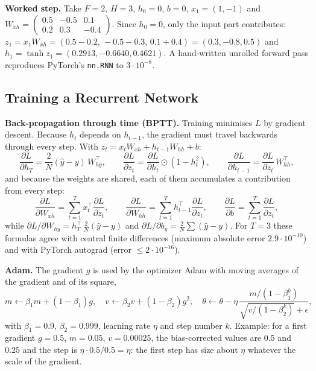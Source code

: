\documentclass[11pt, a4paper]{article}
\begin{document}
\textbf{Worked step.} Take $F=2$, $H=3$, $h_0=0$, $b=0$, $x_1=(1,-1)$ and $W_{xh}=\begin{pmatrix}0.5&-0.5&0.1\\0.2&0.3&-0.4\end{pmatrix}$. Since $h_0=0$, only the input part contributes:
$z_1=x_1W_{xh}=(0.5-0.2,\,-0.5-0.3,\,0.1+0.4)=(0.3,-0.8,0.5)$ and $h_1=\tanh z_1=(0.2913,-0.6640,0.4621)$.
A hand-written unrolled forward pass reproduces PyTorch's \texttt{nn.RNN} to $3\cdot10^{-8}$.

\subsection{Training a Recurrent Network}
\label{sec:train}

\textbf{Back-propagation through time (BPTT).} Training minimises $L$ by gradient descent. Because $h_t$ depends on $h_{t-1}$, the gradient must travel backwards through every step.
With $z_t=x_tW_{xh}+h_{t-1}W_{hh}+b$:
\begin{equation}
\frac{\partial L}{\partial h_T}=\frac{2}{N}(\hat y-y)\,W_{hy}^\top,\qquad
\frac{\partial L}{\partial z_t}=\frac{\partial L}{\partial h_t}\odot(1-h_t^2),\qquad
\frac{\partial L}{\partial h_{t-1}}=\frac{\partial L}{\partial z_t}\,W_{hh}^\top ,
\label{eq:bptt}
\end{equation}
and because the weights are shared, each of them accumulates a contribution from every step:
\begin{equation}
\frac{\partial L}{\partial W_{xh}}=\sum_{t=1}^{T}x_t^\top\frac{\partial L}{\partial z_t},\qquad
\frac{\partial L}{\partial W_{hh}}=\sum_{t=1}^{T}h_{t-1}^\top\frac{\partial L}{\partial z_t},\qquad
\frac{\partial L}{\partial b}=\sum_{t=1}^{T}\frac{\partial L}{\partial z_t},
\end{equation}
while $\partial L/\partial W_{hy}=h_T^\top\,\frac{2}{N}(\hat y-y)$ and $\partial L/\partial b_y=\frac{2}{N}\sum(\hat y-y)$.
For $T=3$ these formulas agree with central finite differences (maximum absolute error $2.9\cdot10^{-10}$) and with PyTorch autograd (error $\le2\cdot10^{-16}$).

\textbf{Adam.} The gradient $g$ is used by the optimizer Adam with moving averages of the gradient and of its square,
\begin{equation}
m\leftarrow\beta_1m+(1-\beta_1)g,\quad v\leftarrow\beta_2v+(1-\beta_2)g^2,\quad
\theta\leftarrow\theta-\eta\,\frac{m/(1-\beta_1^{k})}{\sqrt{v/(1-\beta_2^{k})}+\epsilon},
\end{equation}
with $\beta_1=0.9$, $\beta_2=0.999$, learning rate $\eta$ and step number $k$. Example: for a first gradient $g=0.5$, $m=0.05$, $v=0.00025$, the bias-corrected values are $0.5$ and $0.25$
and the step is $\eta\cdot0.5/0.5=\eta$: the first step has size about $\eta$ whatever the scale of the gradient.
\end{document}
